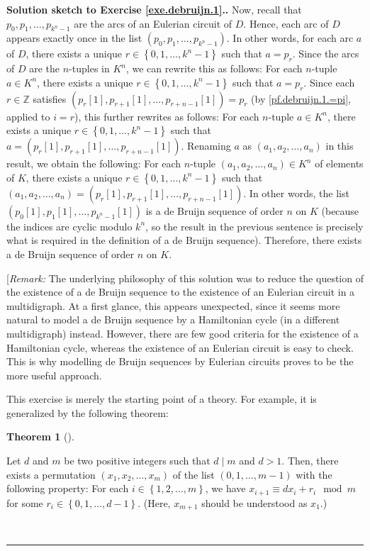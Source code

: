 \documentclass[numbers=enddot,12pt,final,onecolumn,notitlepage]{scrartcl}%
\newcounter{exer}
\theoremstyle{definition}
\newtheorem{theo}{Theorem}[section]
\newenvironment{theorem}[1][]
{\begin{theo}[#1]\begin{leftbar}}
{\end{leftbar}\end{theo}}
\newenvironment{proof}[1][Proof]{\noindent\textbf{#1.} }{\ \rule{0.5em}{0.5em}}
\newcommand{\ZZ}{\mathbb{Z}}
\newcommand{\set}[1]{\left\{ #1 \right\}}
\newcommand{\tup}[1]{\left( #1 \right)}
\newcommand{\ive}[1]{\left[ #1 \right]}
\begin{document}
\begin{proof}[Solution sketch to Exercise \ref{exe.debruijn.1}.]
Now, recall that $p_0, p_1, \ldots, p_{k^n-1}$ are the arcs
of an Eulerian circuit of $D$. Hence, each arc of $D$ appears
exactly once in the list $\tup{p_0, p_1, \ldots, p_{k^n-1}}$.
In other words, for each arc $a$ of $D$, there exists a unique
$r \in \set{0, 1, \ldots, k^n-1}$ such that $a = p_r$.
Since the arcs of $D$ are the $n$-tuples in $K^n$, we can
rewrite this as follows: For each $n$-tuple $a \in K^n$,
there exists a unique
$r \in \set{0, 1, \ldots, k^n-1}$ such that $a = p_r$. Since
each $r \in \ZZ$ satisfies
$\tup{p_r\ive{1}, p_{r+1}\ive{1}, \ldots, p_{r+n-1}\ive{1}}
= p_r$ (by \eqref{pf.debruijn.1.=pi}, applied to $i=r$),
this further rewrites as follows:
For each $n$-tuple $a \in K^n$,
there exists a unique $r \in \set{0, 1, \ldots, k^n-1}$
such that
$a = \tup{p_r\ive{1}, p_{r+1}\ive{1}, \ldots, p_{r+n-1}\ive{1}}$.
Renaming $a$ as $\tup{a_1, a_2, \ldots, a_n}$ in this result,
we obtain the following:
For each
$n$-tuple $\tup{a_1, a_2, \ldots, a_n} \in K^n$ of elements of $K$,
there exists a unique $r \in \set{0, 1, \ldots, k^n-1}$ such
that
$\tup{a_1, a_2, \ldots, a_n}
= \tup{p_r\ive{1}, p_{r+1}\ive{1}, \ldots, p_{r+n-1}\ive{1}}$.
In other words, the list
$\tup{p_0\ive{1}, p_1\ive{1}, \ldots, p_{k^n-1}\ive{1}}$ is a
de Bruijn sequence of order $n$ on $K$ (because the indices are
cyclic modulo $k^n$, so the result in the previous sentence is
precisely what is required in the definition of a de Bruijn
sequence). Therefore, there exists a de Bruijn sequence of order
$n$ on $K$.

[\textit{Remark:} The underlying philosophy of this solution was
to reduce the question of the existence of a de Bruijn sequence
to the existence of an Eulerian circuit in a multidigraph. At a
first glance, this appears unexpected, since it seems more natural
to model a de Bruijn sequence by a Hamiltonian cycle (in a different
multidigraph) instead. However, there are few good criteria for the
existence of a Hamiltonian cycle, whereas the existence of an
Eulerian circuit is easy to check. This is why modelling
de Bruijn sequences by Eulerian circuits proves to be the more
useful approach.

This exercise is merely the starting point of a theory. For example,
it is generalized by the following theorem:
\begin{theorem} \label{sol.debruijn.1.gen}
Let $d$ and $m$ be two positive integers such that $d \mid m$ and
$d > 1$. Then, there exists a permutation
$\tup{x_1, x_2, \ldots, x_m}$ of the list $\tup{0, 1, \ldots, m-1}$
with the following property:
For each $i \in \set{1, 2, \ldots, m}$, we have
$x_{i+1} \equiv d x_i + r_i \mod m$ for some
$r_i \in \set{0, 1, \ldots, d-1}$. (Here, $x_{m+1}$ should be
understood as $x_1$.)
\end{theorem}


\end{proof}
\end{document}
